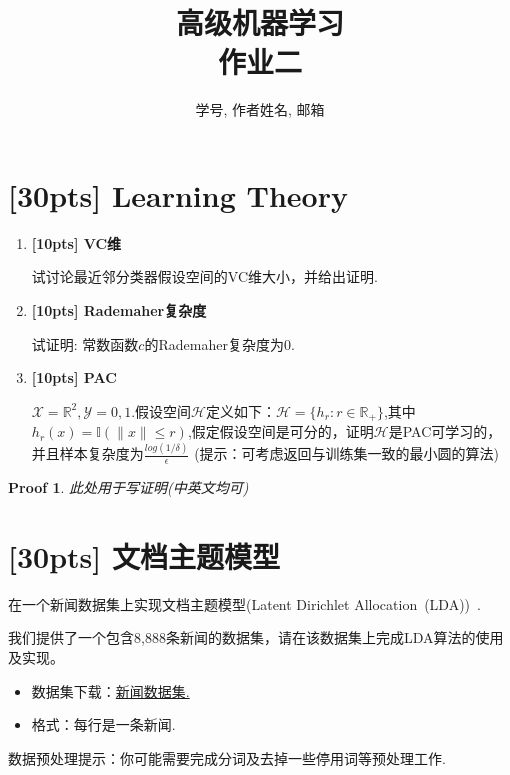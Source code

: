 \documentclass[a4paper,UTF8]{article}
\numberwithin{equation}{section}
\newtheorem*{myProof}{Proof}
\begin{document}
\title{高级机器学习\\
作业二}
\author{学号, 作者姓名, 邮箱}
\maketitle

\section{[30pts] Learning Theory}
\begin{enumerate}[(1)]
	\item \textbf{[10pts] VC维} 

	试讨论最近邻分类器假设空间的VC维大小，并给出证明.
	\item \textbf{[10pts] Rademaher复杂度}
	
	试证明: 常数函数$c$的Rademaher复杂度为$0$.
	\item \textbf{[10pts] PAC} 
	
	$\mathcal{X}=\mathbb{R}^2, \mathcal{Y}= {0,1}.$假设空间$\mathcal{H}$定义如下：$\mathcal{H}=\{h_r:r \in \mathbb{R}_+\}$,其中$h_r (x)=\mathbb{I}(\parallel x \parallel \leq r)$,假定假设空间是可分的，证明$\mathcal{H}$是PAC可学习的，并且样本复杂度为$\frac{log(1/\delta)}{\epsilon}$
	\newline
	(提示：可考虑返回与训练集一致的最小圆的算法)
\end{enumerate}
\begin{myProof}
此处用于写证明(中英文均可)


\end{myProof}
\newpage

\section{[30pts] 文档主题模型}
在一个新闻数据集上实现文档主题模型(Latent Dirichlet Allocation~(LDA))~\cite{DBLP:journals/jmlr/BleiNJ03}.

我们提供了一个包含8,888条新闻的数据集，请在该数据集上完成LDA算法的使用及实现。

\begin{itemize}
	\item 数据集下载：\href{http://lamda.nju.edu.cn/ml2018grad/dataset/news.txt.zip}{新闻数据集.}
	\item 格式：每行是一条新闻.
\end{itemize}

数据预处理提示：你可能需要完成分词及去掉一些停用词等预处理工作.
\end{document}

